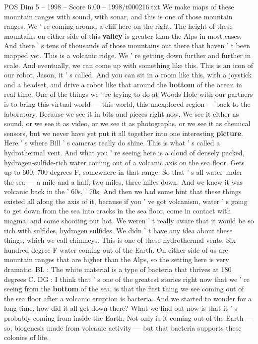 \begin{textsample}{POS Dim 5 – 1998 – Score 6.00 – 1998/t000216.txt}
We make maps of these mountain ranges with sound, with sonar, and this is one of those mountain ranges.
We ' re coming around a cliff here on the right.
The height of these mountains on either side of this \textbf{valley} is greater than the Alps in most cases.
And there ' s tens of thousands of those mountains out there that haven ' t been mapped yet.
This is a volcanic ridge.
We ' re getting down further and further in scale.
And eventually, we can come up with something like this.
This is an icon of our robot, Jason, it ' s called.
And you can sit in a room like this, with a joystick and a headset, and drive a robot like that around the \textbf{bottom} of the ocean in real time.
One of the things we ' re trying to do at Woods Hole with our partners is to bring this virtual world — this world, this unexplored region — back to the laboratory.
Because we see it in bits and pieces right now.
We see it either as sound, or we see it as video, or we see it as photographs, or we see it as chemical sensors, but we never have yet put it all together into one interesting \textbf{picture}.
Here ' s where Bill ' s cameras really do shine.
This is what ' s called a hydrothermal vent.
And what you ' re seeing here is a cloud of densely packed, hydrogen-sulfide-rich water coming out of a volcanic axis on the sea floor.
Gets up to 600, 700 degrees F, somewhere in that range.
So that ' s all water under the sea — a mile and a half, two miles, three miles down.
And we knew it was volcanic back in the ' 60s, ' 70s.
And then we had some hint that these things existed all along the axis of it, because if you ' ve got volcanism, water ' s going to get down from the sea into cracks in the sea floor, come in contact with magma, and come shooting out hot.
We weren ' t really aware that it would be so rich with sulfides, hydrogen sulfides.
We didn ' t have any idea about these things, which we call chimneys.
This is one of these hydrothermal vents.
Six hundred degree F water coming out of the Earth.
On either side of us are mountain ranges that are higher than the Alps, so the setting here is very dramatic.
BL : The white material is a type of bacteria that thrives at 180 degrees C.
DG : I think that ' s one of the greatest stories right now that we ' re seeing from the \textbf{bottom} of the sea, is that the first thing we see coming out of the sea floor after a volcanic eruption is bacteria.
And we started to wonder for a long time, how did it all get down there?
What we find out now is that it ' s probably coming from inside the Earth.
Not only is it coming out of the Earth — so, biogenesis made from volcanic activity — but that bacteria supports these colonies of life.

\end{textsample}
